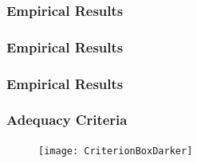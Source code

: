 \begin{frame}%
  \frametitle{Empirical Results}
  \framesubtitle{\mbox{}}
  \begin{center}


\end{center}
\end{frame}

\begin{frame}%
  \frametitle{Empirical Results}
  \framesubtitle{\mbox{}}
  \begin{center}


\end{center}
\end{frame}

\begin{frame}%
  \frametitle{Empirical Results}
  \framesubtitle{\mbox{}}
  \begin{center}


\end{center}
\end{frame}

% 
% 

\begin{frame}%
  \frametitle{Adequacy Criteria}
  \framesubtitle{\mbox{}}
  \vspace*{-.1in}
  \begin{figure}
    \texttt{[image: CriterionBoxDarker]}
  \end{figure}

  
  \vspace{-.075in}

  \begin{figure}
    \begin{centering}
    \end{centering}
  \end{figure}

\end{frame}


